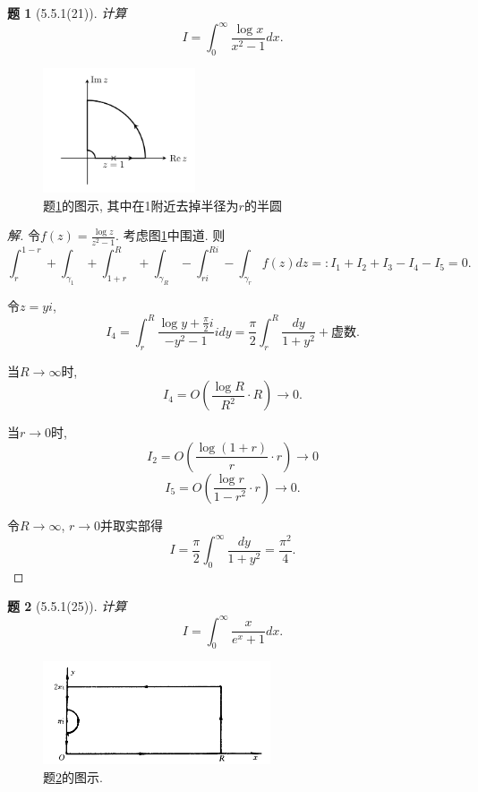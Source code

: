 \documentclass{article}[a4paper, 12pt]
\theoremstyle{mystyle}
\newtheorem{problem}{题}
\newenvironment{solution}{\begin{proof}[解]}{\end{proof}}
\begin{document}
\begin{problem}[5.5.1(21)]\label{21}
  计算\[I=\int_0^\infty \frac{\log x}{x^2-1}dx.\]
\end{problem}

\begin{figure}[htbp]
  \centering
  \includegraphics[width=0.4\textwidth]{images/21.png}
  \caption{题\ref{21}的图示, 其中在1附近去掉半径为\(r\)的半圆}
  \label{fig:21}
\end{figure}

\begin{solution}
  令\(f(z)=\frac{\log z}{z^2-1}\). 考虑图\ref{fig:21}中围道. 则\[\int_{r}^{1-r}+\int_{\gamma_1}+\int_{1+r}^R+\int_{\gamma_R}-\int_{ri}^{Ri}-\int_{\gamma_r} f(z)dz=:I_1+I_2+I_3-I_4-I_5=0.\]

  令\(z=yi\), \[I_4=\int_r^R\frac{\log y+\frac{\pi}{2}i}{-y^2-1}idy=\frac{\pi}{2}\int_r^R\frac{dy}{1+y^2}+\text{虚数}.\]

  当\(R\to\infty\)时, \[I_4=O\left(\frac{\log R}{R^2}\cdot R\right)\to0.\]

  当\(r\to0\)时, \[I_2=O\left(\frac{\log (1+r)}{r}\cdot r\right)\to0\] \[I_5=O\left(\frac{\log r}{1-r^2}\cdot r\right)\to0.\]

  令\(R\to\infty\), \(r\to0\)并取实部得\[I=\frac{\pi}{2}\int_0^\infty\frac{dy}{1+y^2}=\frac{\pi^2}{4}.\tag*{\(\qed\)}\]
  \renewcommand{\qedsymbol}{}
\end{solution}

\begin{problem}[5.5.1(25)] \label{25}
  计算\[I=\int_0^\infty \frac{x}{e^x+1}dx.\]
\end{problem}

\begin{figure}[htbp]
  \centering
  \includegraphics[width=0.6\textwidth]{images/25.png}
  \caption{题\ref{25}的图示.}
  \label{fig:25}
\end{figure}
\end{document}
